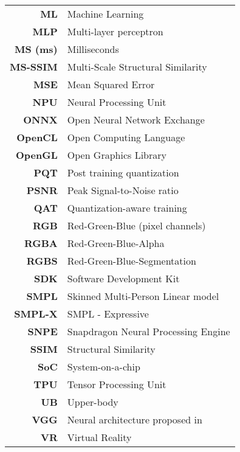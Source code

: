 \begin{changemargin}{-1.5cm}{0cm}
\begin{tabular}{>{\bf}r l@{}}
	ML & Machine Learning \\
	MLP & Multi-layer perceptron \\
	MS (ms) & Milliseconds \\
	MS-SSIM & Multi-Scale Structural Similarity \\
	MSE & Mean Squared Error \\
	NPU & Neural Processing Unit \\
	ONNX & Open Neural Network Exchange \\
	OpenCL & Open Computing Language \\
	OpenGL & Open Graphics Library \\
	PQT & Post training quantization \\
	PSNR & Peak Signal-to-Noise ratio \\
	QAT & Quantization-aware training \\
	RGB & Red-Green-Blue (pixel channels) \\
	RGBA & Red-Green-Blue-Alpha \\
	RGBS & Red-Green-Blue-Segmentation \\
	SDK & Software Development Kit \\
	SMPL & Skinned Multi-Person Linear model \cite{dnn:smpl15} \\
	SMPL-X & SMPL - Expressive \cite{dnn:smplx19}\\
	SNPE & Snapdragon Neural Processing Engine \\
	SSIM & Structural Similarity \\
	SoC & System-on-a-chip \\
	TPU & Tensor Processing Unit \\
	UB & Upper-body \\
	VGG & Neural architecture proposed in \cite{dnn:vgg14}\\
	VR & Virtual Reality \\
\end{tabular}
\end{changemargin}

